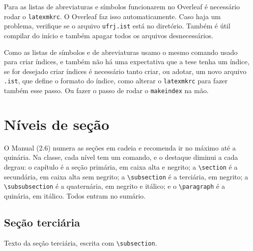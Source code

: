\documentclass[dsc,setavermelha,numeracaoporcapitulo,linhanafolhaderosto]{ufrj}
\theoremstyle{plain}
\theoremstyle{definition}
\theoremstyle{remark}
\begin{document}
  Para as listas de abreviaturas e símbolos funcionarem no Overleaf é necessário rodar o \verb|latexmkrc|. O Overleaf faz isso automaticamente. Caso haja um problema, verifique se o arquivo \verb|ufrj.ist| está no diretório. Também é útil compilar do início e também apagar todos os arquivos desnecessários.

  Como as listas de símbolos e de abreviaturas usamo o mesmo comando usado para criar índices, e também não há uma expectativa que a tese tenha um índice, se for desejado criar índices é necessário tanto criar, ou adotar, um novo arquivo \verb*|.ist|, que define o formato do índice, como alterar o \verb*|latexmkrc| para fazer também esse passo. Ou fazer o passo de rodar o \verb*|makeindex| na mão.

\section{Níveis de seção}
\label{sec:niveis}

O Manual (2.6) numera as seções em cadeia e recomenda ir no máximo até a quinária. Na classe, cada nível tem um comando, e o destaque diminui a cada degrau: o capítulo é a seção primária, em caixa alta e negrito; a \verb|\section| é a secundária, em caixa alta sem negrito; a \verb|\subsection| é a terciária, em negrito; a \verb|\subsubsection| é a quaternária, em negrito e itálico; e o \verb|\paragraph| é a quinária, em itálico. Todos entram no sumário.

\subsection{Seção terciária}

Texto da seção terciária, escrita com \verb|\subsection|.
\end{document}
